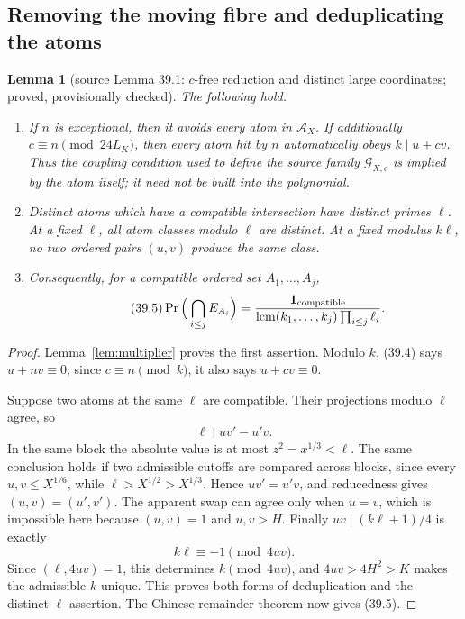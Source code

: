 \documentclass[10pt,reqno]{amsart}
\newtheorem{lemma}[theorem]{Lemma}
\theoremstyle{definition}
\newcommand{\lcm}{\operatorname {lcm}}
\newcommand{\1}{\mathbf 1}
\begin{document}
\subsection{Removing the moving fibre and deduplicating the atoms}
\begin{lemma}[source Lemma 39.1: $c$-free reduction and distinct large
coordinates; proved, provisionally checked]\label{lem:cfree}
The following hold.
\begin{enumerate}[leftmargin=*]
\item If $n$ is exceptional, then it avoids every atom in $\mathcal A_X$.
If additionally $c\equiv n\pmod{24L_K}$, then every atom hit by $n$
automatically obeys $k\mid u+cv$.  Thus the coupling condition used to
define the source family $\mathscr G_{X,c}$ is implied by the atom itself;
it need not be built into the polynomial.
\item Distinct atoms which have a compatible intersection have distinct
primes $\ell$.  At a fixed $\ell$, all atom classes modulo $\ell$ are
distinct.  At a fixed modulus $k\ell$, no two ordered pairs $(u,v)$ produce
the same class.
\item Consequently, for a compatible ordered set $A_1,\ldots,A_j$,
\begin{equation}\tag{39.5}
 \Pr\Big(\bigcap_{i\leq j}E_{A_i}\Big)
 =\frac{\mathbf1_{\rm compatible}}
 {\lcm(k_1,\ldots,k_j)\prod_{i\leq j}\ell_i}.
\end{equation}
\end{enumerate}
\end{lemma}
\begin{proof}
Lemma~\ref{lem:multiplier} proves the first assertion.  Modulo $k$,
(39.4) says $u+nv\equiv0$; since $c\equiv n\pmod k$, it also says
$u+cv\equiv0$.

Suppose two atoms at the same $\ell$ are compatible.  Their projections
modulo $\ell$ agree, so
\[
 \ell\mid uv'-u'v.
\]
In the same block the absolute value is at most $z^2=x^{1/3}<\ell$.  The
same conclusion holds if two admissible cutoffs are compared across blocks,
since every $u,v\leq X^{1/6}$, while $\ell>X^{1/2}>X^{1/3}$.  Hence
$uv'=u'v$, and reducedness gives $(u,v)=(u',v')$.  The apparent swap can
agree only when $u=v$, which is impossible here because $(u,v)=1$ and
$u,v>H$.  Finally $uv\mid(k\ell+1)/4$ is exactly
\[
 k\ell\equiv-1\pmod{4uv}.
\]
Since $(\ell,4uv)=1$, this determines $k\pmod{4uv}$, and
$4uv>4H^2>K$ makes the admissible $k$ unique.  This proves both forms of
deduplication and the distinct-$\ell$ assertion.  The Chinese remainder
theorem now gives (39.5).
\end{proof}
\end{document}
